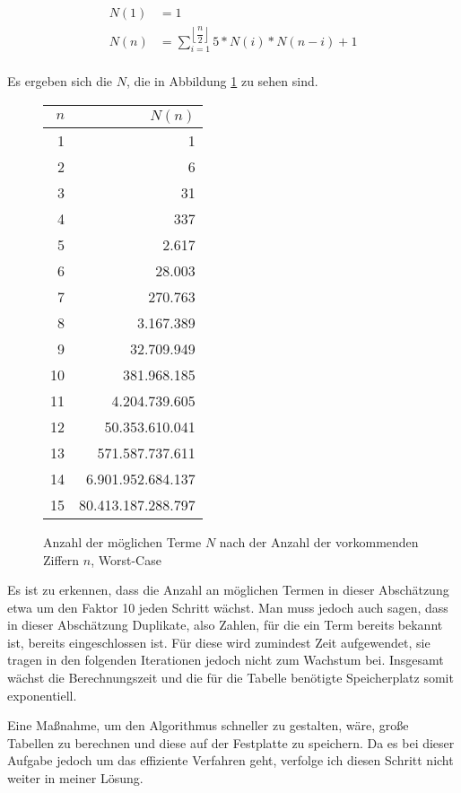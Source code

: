 \documentclass[a4paper,10pt,ngerman]{scrartcl}
\begin{document}
\begin{align*}
N(1) &= 1 \\
N(n) &= \sum_{i=1}^{\left \lfloor \dfrac{n}{2} \right \rfloor}5*N(i)*N(n-i)+1 \\
\end{align*}

Es ergeben sich die $N$, die in Abbildung \ref{fig:anzahl-terme} zu sehen sind.

\begin{figure}[]
  \centering
  \begin{tabular}{|r|r|}
  $n$ & $N(n)$ \\ \hline
  1 & 1 \\ \hline
  2 & 6 \\ \hline
  3 & 31 \\ \hline
  4 & 337 \\ \hline
  5 & 2.617 \\ \hline
  6 & 28.003 \\ \hline
  7 & 270.763 \\ \hline
  8 & 3.167.389 \\ \hline
  9 & 32.709.949 \\ \hline
  10 & 381.968.185 \\ \hline
  11 & 4.204.739.605 \\ \hline
  12 & 50.353.610.041 \\ \hline
  13 & 571.587.737.611 \\ \hline
  14 & 6.901.952.684.137 \\ \hline
  15 & 80.413.187.288.797
  \end{tabular}
  \caption{Anzahl der möglichen Terme $N$ nach der Anzahl der vorkommenden Ziffern $n$, Worst-Case}
  \label{fig:anzahl-terme}
\end{figure}

Es ist zu erkennen, dass die Anzahl an möglichen Termen in dieser Abschätzung etwa um den Faktor 10 jeden Schritt wächst.
Man muss jedoch auch sagen, dass in dieser Abschätzung Duplikate, also Zahlen, für die ein Term bereits bekannt ist, bereits eingeschlossen ist.
Für diese wird zumindest Zeit aufgewendet, sie tragen in den folgenden Iterationen jedoch nicht zum Wachstum bei.
Insgesamt wächst die Berechnungszeit und die für die Tabelle benötigte Speicherplatz somit exponentiell.

Eine Maßnahme, um den Algorithmus schneller zu gestalten, wäre, große Tabellen zu berechnen und diese auf der Festplatte zu speichern.
Da es bei dieser Aufgabe jedoch um das effiziente Verfahren geht, verfolge ich diesen Schritt nicht weiter in meiner Lösung.
\end{document}
